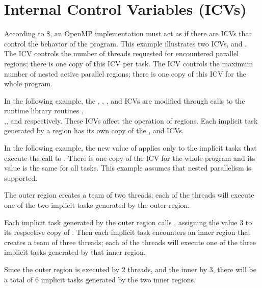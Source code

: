 \pagebreak
\chapter{Internal Control Variables (ICVs)}
\label{chap:icv}

According to \$, an OpenMP implementation must act as if there are ICVs that control 
the behavior of the program.  This example illustrates two ICVs,  
and . The  ICV controls the 
number of threads requested for encountered parallel regions; there is one copy 
of this ICV per task. The  ICV controls the maximum 
number of nested active parallel regions; there is one copy of this ICV for the 
whole program.

In the following example, the , , 
, and  ICVs are modified through calls to 
the runtime library routines ,\\ ,, and  respectively. These ICVs 
affect the operation of  regions. Each implicit task generated 
by a  region has its own copy of the , 
and  ICVs.

In the following example, the new value of  applies only to 
the implicit tasks that execute the call to . There 
is one copy of the  ICV for the whole program and 
its value is the same for all tasks. This example assumes that nested parallelism 
is supported.

The outer  region creates a team of two threads; each of the threads 
will execute one of the two implicit tasks generated by the outer  
region.

Each implicit task generated by the outer  region calls , 
assigning the value 3 to its respective copy of . Then each 
implicit task encounters an inner  region that creates a team 
of three threads; each of the threads will execute one of the three implicit tasks 
generated by that inner  region.

Since the outer  region is executed by 2 threads, and the inner 
by 3, there will be a total of 6 implicit tasks generated by the two inner  
regions.

